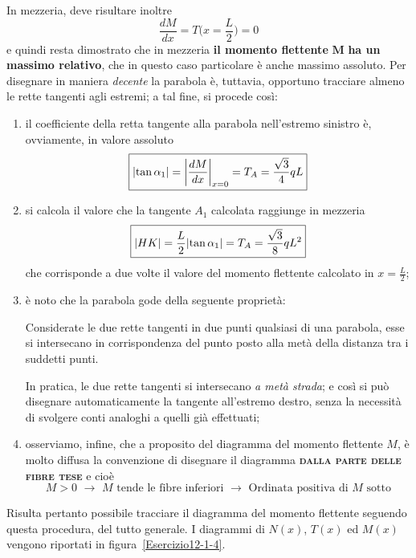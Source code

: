 In mezzeria, deve risultare inoltre 
\begin{equation*}
\boxed{ \frac{dM}{dx} = T\biggl(  x=\frac{L}{2} \biggr) = 0 }
\end{equation*}
e quindi resta dimostrato che in mezzeria \textbf{il momento flettente} $\mathbf{M}$ \textbf{ha un massimo relativo}, che in questo caso particolare è anche massimo assoluto. Per disegnare in maniera \emph{decente} la parabola è, tuttavia, opportuno tracciare almeno le rette tangenti agli estremi; a tal fine, si procede così:
\begin{enumerate}
\item il coefficiente della retta tangente alla parabola nell'estremo sinistro è, ovviamente, in valore assoluto 
\begin{equation*}
\boxed{ \abs{\tan{\alpha_{1}}} = \abs*{\frac{dM}{dx}}_{x=0} = T_{A} = \frac{\sqrt{3}}{4}qL }
\end{equation*}
\item si calcola il valore che la tangente $A_{1}$ calcolata raggiunge in mezzeria
\begin{equation*}
\boxed{ \abs{HK} = \frac{L}{2} \abs{\tan{\alpha_{1}}} = T_{A} = \frac{\sqrt{3}}{8}qL^{2} }
\end{equation*}
che corrisponde a due volte il valore del momento flettente calcolato in $x=\frac{L}{2}$; 
\item è noto che la parabola gode della seguente proprietà: 
\begin{propr}
Considerate le due rette tangenti in due punti qualsiasi di una parabola, esse si intersecano in corrispondenza del punto posto alla metà della distanza tra i suddetti punti.
\end{propr}
In pratica, le due rette tangenti si intersecano \emph{a metà strada}; e così si può disegnare automaticamente la tangente all'estremo destro, senza la necessità di svolgere conti analoghi a quelli già effettuati;
\item osserviamo, infine, che a proposito del diagramma del momento flettente $M$, è molto diffusa la convenzione di disegnare il diagramma \textbf{\textsc{dalla parte delle fibre tese}} e cioè
\begin{equation*}
\boxed{
M>0 \,\, \longrightarrow \,\, M \text{ tende le fibre inferiori} \,\, \longrightarrow \,\, \text{Ordinata positiva di } M \text{ sotto}
}
\end{equation*}
\end{enumerate}
Risulta pertanto possibile tracciare il diagramma del momento flettente seguendo questa procedura, del tutto generale. I diagrammi di $N(x)$, $T(x)$ ed $M(x)$ vengono riportati in figura~\ref{Esercizio12-1-4}.
\clearpage
